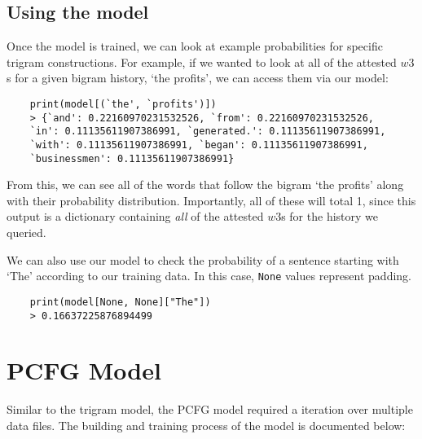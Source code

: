 \documentclass{article}
\begin{document}
\subsection{Using the model}
Once the model is trained, we can look at example probabilities for specific trigram constructions. For example, if we wanted to look at all of the attested $w3$s for a given bigram history, `the profits', we can access them via our model:
\begin{verbatim}
    print(model[(`the', `profits')])
    > {`and': 0.22160970231532526, `from': 0.22160970231532526,
    `in': 0.11135611907386991, `generated.': 0.11135611907386991,
    `with': 0.11135611907386991, `began': 0.11135611907386991,
    `businessmen': 0.11135611907386991}
\end{verbatim}

From this, we can see all of the words that follow the bigram `the profits' along with their probability distribution. Importantly, all of these will total 1, since this output is a dictionary containing \textit{all} of the attested $w3$s for the history we queried.  

We can also use our model to check the probability of a sentence starting with `The' according to our training data. In this case, \texttt{None} values represent padding.

\begin{verbatim}
    print(model[None, None]["The"])
    > 0.16637225876894499
\end{verbatim}




\section{PCFG Model}
Similar to the trigram model, the PCFG model required a iteration over multiple data files. The building and training process of the model is documented below: 
\end{document}
